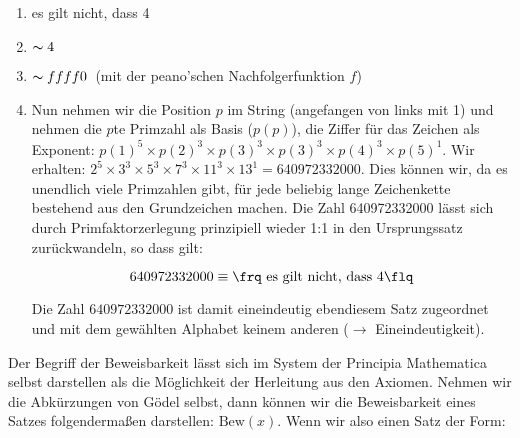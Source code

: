 \begin{enumerate}
	\item \frq es gilt nicht, dass 4\flq
	\item \frq$\thicksim 4$\flq
	\item \frq$\thicksim ffff0$\flq\ (mit der peano'schen Nachfolgerfunktion $f$)
	\item Nun nehmen wir die Position $p$ im String (angefangen von links mit 1)
		und nehmen die $p$te Primzahl als Basis ($p(p)$), die Ziffer für das Zeichen
		als Exponent: $p(1)^5 \times p(2)^3 \times p(3)^3 \times p(3)^3 \times p(4)^3 \times p(5)^1$.
		Wir erhalten:
		$2^5 \times 3^3 \times 5^3 \times 7^3 \times 11^3 \times 13^1 = 640972332000$. Dies
		können wir, da es unendlich viele Primzahlen gibt, für 
		jede beliebig lange Zeichenkette 
		bestehend aus den Grundzeichen machen. Die Zahl 640972332000 lässt sich durch 
		Primfaktorzerlegung prinzipiell wieder 1:1 in den Ursprungssatz zurückwandeln, so dass gilt:

		$$ 640972332000 \equiv \text{\frq es gilt nicht, dass 4\flq} $$

		Die Zahl $640972332000$ ist damit eineindeutig ebendiesem Satz zugeordnet und mit dem
		gewählten Alphabet keinem anderen ($\longrightarrow$ Eineindeutigkeit).
\end{enumerate}

Der Begriff der Beweisbarkeit
lässt sich im System der Principia Mathematica selbst
darstellen als die Möglichkeit der Herleitung aus den Axiomen. Nehmen wir die Abkürzungen
von Gödel selbst, dann können wir die Beweisbarkeit eines Satzes folgendermaßen
darstellen: $\text{Bew}\left(x\right)$.
Wenn wir also einen Satz der Form:

